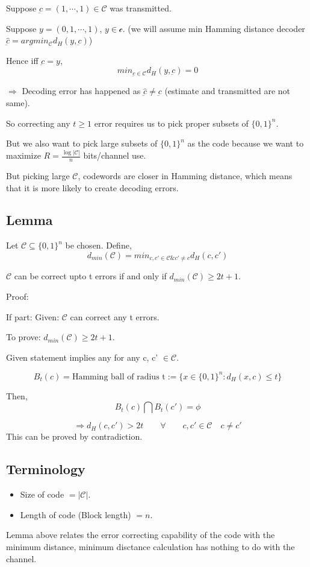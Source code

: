 \documentclass{article}
\begin{document}
Suppose $\underbar{c}=(1,\cdots,1) \in \mathscr{C}$ was transmitted.

Suppose $y=(0,1,\cdots,1)$, $y \in \mathscr{c}$. (we will assume min Hamming distance decoder $\hat{\underbar{c}}= argmin_{\mathscr{C}} d_H(y, \underbar{c})$)

Hence iff $\underbar{c}=y$,
$$ min_{\underbar{c} \in \mathscr{C}} d_H(y,\underbar{c}) = 0$$

$\Rightarrow$ Decoding error has happened as $\hat{\underbar{c}} \neq \underbar{c}$ (estimate and transmitted are not same).

So correcting any $t \geq 1$ error requires us to pick proper subsets of $\{ 0,1\}^n$.

But we also want to pick large subsets of $\{ 0,1\}^n $ as the code because we want to maximize $R= \frac{\log |\mathscr{C}|}{n}$ bits/channel use.

But picking large $\mathscr{C}$, codewords are closer in Hamming distance, which means that it is more likely to create decoding errors.

\subsection{Lemma}
Let $\mathscr{C} \subseteq \{ 0,1\}^n$ be chosen.
Define,
$$ d_{min}(\mathscr{C})= min_{c,c' \in \mathscr{C} \& c' \neq c} d_H(c,c')$$

$\mathscr{C}$ can be correct upto t errors if and only if $d_{min}(\mathscr{C})\geq 2t+1$.

Proof:

If part: Given: $\mathscr{C}$ can correct any t errors.

To prove: $d_{min}(\mathscr{C})\geq 2t+1$.

Given statement implies any for any c, c' $\in \mathscr{C}$.

$$ B_{t}(c)= \text{Hamming ball of radius t} := \{ x \in \{ 0,1\}^n : d_H (x,c) \leq t\}$$

Then,
$$ B_t(c) \bigcap B_t(c') = \phi$$

$$ \Rightarrow d_H(c,c') > 2t \qquad \forall \qquad c, c' \in \mathscr{C} \quad c \neq c'$$
This can be proved by contradiction.

\subsection{Terminology}


\begin{itemize}
    \item Size of code $= |\mathscr{C}|$.
    \item Length of code (Block length) $=n$.
\end{itemize}
Lemma above relates the error correcting capability of the code with the minimum distance, minimum disctance calculation has nothing to do with the channel.
\end{document}
